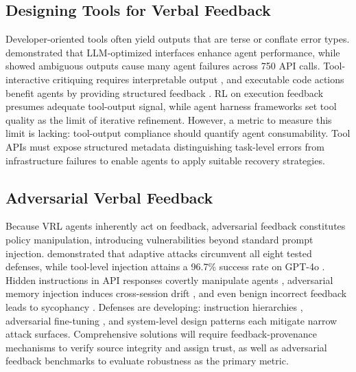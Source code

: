  


\subsection{Designing Tools for Verbal Feedback}
\label{sec:designing_tools}
Developer-oriented tools often yield outputs that are terse or conflate error types. \citet{yang2024swe} demonstrated that LLM-optimized interfaces enhance agent performance, while \citet{bandlamudi2025framework} showed ambiguous outputs cause many agent failures across 750 API calls. Tool-interactive critiquing requires interpretable output \citep{gou2024critic}, and executable code actions benefit agents by providing structured feedback \citep{wang2024executable}. RL on execution feedback \citep{gehring2024rlef} presumes adequate tool-output signal, while agent harness frameworks \citep{ning2026code} set tool quality as the limit of iterative refinement. However, a metric to measure this limit is lacking: tool-output compliance should quantify agent consumability. Tool APIs must expose structured metadata distinguishing task-level errors from infrastructure failures to enable agents to apply suitable recovery strategies.





\subsection{Adversarial Verbal Feedback}
\label{sec:adversarial_verbal_feedback}
Because VRL agents inherently act on feedback, adversarial feedback constitutes policy manipulation, introducing vulnerabilities beyond standard prompt injection. \citet{zhan2025adaptive} demonstrated that adaptive attacks circumvent all eight tested defenses, while tool-level injection attains a 96.7\% success rate on GPT-4o \citep{shi2025prompt}. Hidden instructions in API responses covertly manipulate agents \citep{zhan2024injecagent}, adversarial memory injection induces cross-session drift \citep{dong2026memory}, and even benign incorrect feedback leads to sycophancy \citep{sharma2024towards}. Defenses are developing: instruction hierarchies \citep{wallace2024instruction}, adversarial fine-tuning \citep{chen2025secaligndefendingpromptinjection}, and system-level design patterns \citep{beurer2025design} each mitigate narrow attack surfaces. Comprehensive solutions will require feedback-provenance mechanisms to verify source integrity and assign trust, as well as adversarial feedback benchmarks to evaluate robustness as the primary metric.
 
